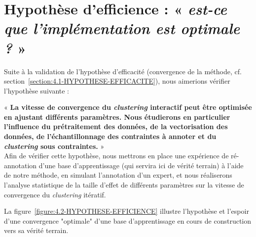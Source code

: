     \section{Hypothèse d'efficience : « \textit{est-ce que l'implémentation est optimale ?} »}
	\label{section:4.2-HYPOTHESE-EFFICIENCE}
	
		Suite à la validation de l'hypothèse d'efficacité (convergence de la méthode, cf. section~\ref{section:4.1-HYPOTHESE-EFFICACITE}), nous aimerions vérifier l'hypothèse suivante :

		\begin{tcolorbox}[
			title=\textbf{Hypothèse d'efficience},
			colback=gray!20,
			colframe=gray!50!black!75,
			width=\linewidth
		]

			« \textbf{
				La vitesse de convergence du \textit{clustering} interactif peut être optimisée en ajustant différents paramètres. Nous étudierons en particulier l'influence du prétraitement des données, de la vectorisation des données, de l'échantillonnage des contraintes à annoter et du \textit{clustering} sous contraintes.
			} » \\
			
			Afin de vérifier cette hypothèse, nous mettrons en place une expérience de ré-annotation d'une base d'apprentissage (qui servira ici de vérité terrain) à l'aide de notre méthode, en simulant l'annotation d'un expert, et nous réaliserons l'analyse statistique de la taille d'effet de différents paramètres sur la vitesse de convergence du \textit{clustering} itératif.
			
			La figure~\ref{figure:4.2-HYPOTHESE-EFFICIENCE} illustre l'hypothèse et l'espoir d'une convergence "optimale" d'une base d'apprentissage en cours de construction vers sa vérité terrain.
			

\end{tcolorbox}
